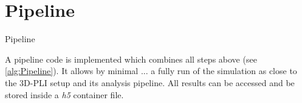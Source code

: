 \section{Pipeline}
% 
\begin{lstfloat}[!tb]
\centering
\scalebox{0.75}{
\begin{minipage}{\the\textwidth}

\end{minipage}}
\caption[simpli pipeline]{Pipeline}
\label{alg:Pipeline}
\end{lstfloat}
% 
A pipeline code is implemented which combines all steps above (see \cref{alg:Pipeline}).
It allows by minimal ... a fully run of the simulation as close to the \ac{3D-PLI} setup and its analysis pipeline.
All results can be accessed and be stored inside a \textit{h5} container file.
